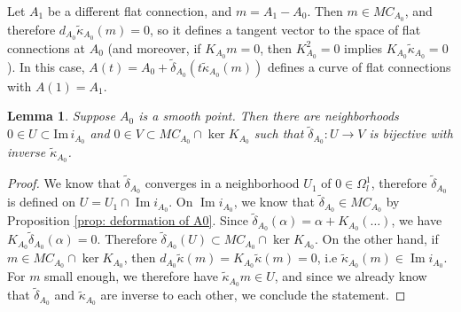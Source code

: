 \documentclass[11pt,a4paper]{amsart}
\theoremstyle{plain} %
\newtheorem{lem}[thm]{Lemma}
\theoremstyle{definition}
\theoremstyle{remark}
\newcommand{\dd}{d}
\newcommand{\mr}{\mathrm}
\newcommand{\til}{\widetilde}
\begin{document}
  Let $A_1$ be a different flat connection, and $m = A_1 - A_0$. Then $m \in MC_{A_0}$, and therefore $\dd_{A_0}\til\kappa_{A_0}(m)=0$, so it defines a tangent vector to the space of flat connections at $A_0$ (and moreover, if $K_{A_0}m = 0$, then $K_{A_0}^2 = 0$ implies $K_{A_0}\til{\kappa}_{A_0} = 0$). In this case, $A(t) = A_0+\til{\delta}_{A_0}(t \til{\kappa}_{A_0}(m))$ defines a curve of flat connections with $A(1) = A_1$. %
  \begin{lem}Suppose $A_0$ is a smooth point. Then there are neighborhoods  $0 \in U \subset \mathrm{Im}\, i_{A_0}$ and $0 \in V \subset MC_{A_0} \cap \ker K_{A_0}$ such that 
      $ \til{\delta}_{A_0}\colon U \to V$ is bijective with inverse $\til{\kappa}_{A_0}$. 
  \end{lem}
  \begin{proof}
      We know that $\til{\delta}_{A_0}$ converges in a neighborhood $U_1$ of $0 \in \Omega^1_l$, therefore $\til{\delta}_{A_0}$ is defined on $U = U_1 \cap \operatorname{Im}i_{A_0}$. On $\operatorname{Im} i_{A_0}$, we know that $\til{\delta}_{A_0} \in MC_{A_0}$ by Proposition \ref{prop: deformation of A0}. Since $\til{\delta}_{A_0}(\alpha) = \alpha + K_{A_0}(\ldots)$, we have $K_{A_0}\til\delta_{A_0}(\alpha) = 0$. Therefore $\til\delta_{A_0}(U) \subset  MC_{A_0} \cap \ker K_{A_0}$. On the other hand, if $m \in MC_{A_0} \cap \ker K_{A_0}$, then $\dd_{A_0}\til{\kappa}(m) = K_{A_0}\til{\kappa}(m) = 0$, i.e $\til{\kappa}_{A_0}(m) \in \operatorname{Im}i_{A_0}$. For $m$ small enough, we therefore have $\til\kappa_{A_0}m \in U$, and since we already know that $\til{\delta}_{A_0}$ and $\til\kappa_{A_0}$ are inverse to each other, we conclude the statement. 
  \end{proof}
\end{document}
